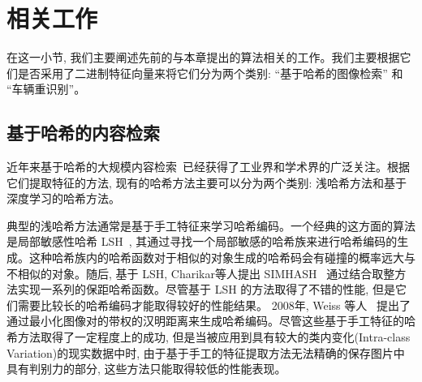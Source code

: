 \section{相关工作}
在这一小节, 我们主要阐述先前的与本章提出的算法相关的工作。我们主要根据它们是否采用了二进制特征向量来将它们分为两个类别: ``基于哈希的图像检索'' 和 ``车辆重识别''。
\subsection{基于哈希的内容检索}
近年来基于哈希的大规模内容检索~\cite{indyk1997locality, weiss2008spectral, gong2012iterative,heo2012spherical, jegou2010product, ge2013optimized, li2018deep}已经获得了工业界和学术界的广泛关注。根据它们提取特征的方法, 现有的哈希方法主要可以分为两个类别: 浅哈希方法和基于深度学习的哈希方法。\par
典型的浅哈希方法通常是基于手工特征来学习哈希编码。一个经典的这方面的算法是局部敏感性哈希 LSH~\cite{indyk1997locality}, 其通过寻找一个局部敏感的哈希族来进行哈希编码的生成。这种哈希族内的哈希函数对于相似的对象生成的哈希码会有碰撞的概率远大与不相似的对象。随后, 基于 LSH, Charikar等人提出 SIMHASH~\cite{charikar2002similarity} 通过结合取整方法实现一系列的保距哈希函数。尽管基于 LSH 的方法取得了不错的性能, 但是它们需要比较长的哈希编码才能取得较好的性能结果。 2008年, Weiss 等人~\cite{weiss2008spectral} 提出了通过最小化图像对的带权的汉明距离来生成哈希编码。尽管这些基于手工特征的哈希方法取得了一定程度上的成功, 但是当被应用到具有较大的类内变化(Intra-class Variation)的现实数据中时, 由于基于手工的特征提取方法无法精确的保存图片中具有判别力的部分, 这些方法只能取得较低的性能表现。\par
